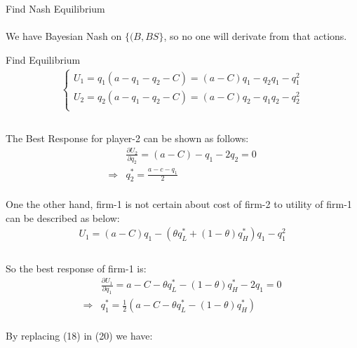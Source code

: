 \documentclass[
  course = {{IE579 Game Theory and Multi-Agent Reinforcement Learning}},
  quartile = {{4}},
  assignment = 2,
  name = {{Mohammad Mahdi Rahimi}},
  studentnumber = {{20208244}},
  email = {{mahi@kaist.ac.kr}},
  firstexercise = 1
]{aga-homework}
\begin{document}
Find Nash Equilibrium
\\\\
We have Bayesian Nash on $\{(B, BS\}$, so no one will derivate from that actions.


\exercise
\subexercise Find Equilibrium
\begin{equation}
    \begin{split}
        \begin{cases}
        U_1 = q_1(a - q_1 - q_2 - C) = (a - C)q_1 - q_2q_1 - q^2_1\\
        U_2 = q_2(a - q_1 - q_2 - C) = (a - C)q_2 - q_1q_2 - q^2_2\\
        \end{cases}\\
    \end{split}
\end{equation}\\
The Best Response for player-2 can be shown as follows:\\
\begin{equation}
    \begin{split}
        & \frac{\partial U_2}{\partial q_2} = (a - C) - q_1 - 2q_2 = 0\\
        \Rightarrow & q^*_2 = \frac{a - c - q_1}{2}
    \end{split}
\end{equation}\\
One the other hand, firm-1 is not certain about cost of firm-2 to utility of firm-1 can be described as below:\\
\begin{equation}
    \begin{split}
        U_1 = (a - C)q_1 - (\theta q^*_L + (1 - \theta) q^*_H)q_1 - q^2_1\\
    \end{split}
\end{equation}\\
So the best response of firm-1 is:
\begin{equation}
    \begin{split}
        & \frac{\partial U_1}{\partial q_1} = a - C - \theta q^*_L - (1 - \theta) q^*_H - 2q_1 = 0\\
        \Rightarrow & q^*_1 =  \frac{1}{2}(a - C - \theta q^*_L - (1 - \theta) q^*_H)
    \end{split}
\end{equation}\\
By replacing (18) in (20) we have:
\end{document}
